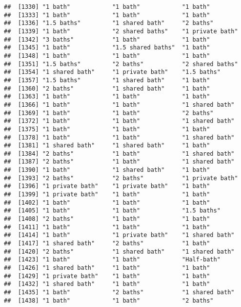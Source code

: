 \documentclass[
]{article}
\begin{document}
\begin{verbatim}
##  [1330] "1 bath"            "1 bath"            "1 bath"           
##  [1333] "1 bath"            "1 bath"            "1 bath"           
##  [1336] "1.5 baths"         "1 shared bath"     "2 baths"          
##  [1339] "1 bath"            "2 shared baths"    "1 private bath"   
##  [1342] "3 baths"           "1 bath"            "1 bath"           
##  [1345] "1 bath"            "1.5 shared baths"  "1 bath"           
##  [1348] "1 bath"            "1 bath"            "1 bath"           
##  [1351] "1.5 baths"         "2 baths"           "2 shared baths"   
##  [1354] "1 shared bath"     "1 private bath"    "1.5 baths"        
##  [1357] "1.5 baths"         "1 shared bath"     "1 bath"           
##  [1360] "2 baths"           "1 shared bath"     "1 bath"           
##  [1363] "1 bath"            "1 bath"            "1 bath"           
##  [1366] "1 bath"            "1 bath"            "1 shared bath"    
##  [1369] "1 bath"            "1 bath"            "2 baths"          
##  [1372] "1 bath"            "1 bath"            "1 shared bath"    
##  [1375] "1 bath"            "1 bath"            "1 bath"           
##  [1378] "1 bath"            "1 bath"            "1 shared bath"    
##  [1381] "1 shared bath"     "1 shared bath"     "1 bath"           
##  [1384] "2 baths"           "1 bath"            "1 shared bath"    
##  [1387] "2 baths"           "1 bath"            "1 shared bath"    
##  [1390] "1 bath"            "1 shared bath"     "1 bath"           
##  [1393] "2 baths"           "2 baths"           "1 private bath"   
##  [1396] "1 private bath"    "1 private bath"    "1 bath"           
##  [1399] "1 private bath"    "1 bath"            "1 bath"           
##  [1402] "1 bath"            "1 bath"            "1 bath"           
##  [1405] "1 bath"            "1 bath"            "1.5 baths"        
##  [1408] "2 baths"           "1 bath"            "1 bath"           
##  [1411] "1 bath"            "1 bath"            "1 bath"           
##  [1414] "1 bath"            "1 private bath"    "1 shared bath"    
##  [1417] "1 shared bath"     "2 baths"           "1 bath"           
##  [1420] "2 baths"           "1 shared bath"     "1 shared bath"    
##  [1423] "1 bath"            "1 bath"            "Half-bath"        
##  [1426] "1 shared bath"     "1 bath"            "1 bath"           
##  [1429] "1 private bath"    "1 bath"            "1 bath"           
##  [1432] "1 shared bath"     "1 bath"            "1 bath"           
##  [1435] "1 bath"            "2 baths"           "1 shared bath"    
##  [1438] "1 bath"            "1 bath"            "2 baths"          

\end{verbatim}
\end{document}
